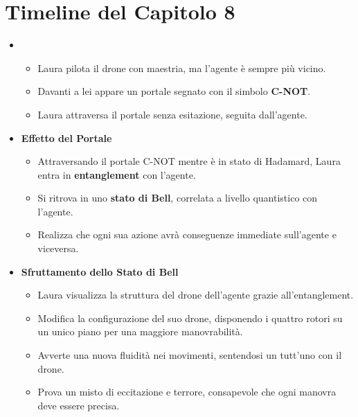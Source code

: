 \section*{Timeline del Capitolo 8}
\begin{itemize}
  \item
    \begin{itemize}
        \item Laura pilota il drone con maestria, ma l'agente è sempre più vicino.
        \item Davanti a lei appare un portale segnato con il simbolo \textbf{C-NOT}.
        \item Laura attraversa il portale senza esitazione, seguita dall'agente.
    \end{itemize}
    \item \textbf{Effetto del Portale}
    \begin{itemize}
        \item Attraversando il portale C-NOT mentre è in stato di Hadamard, Laura entra in \textbf{entanglement} con l'agente.
        \item Si ritrova in uno \textbf{stato di Bell}, correlata a livello quantistico con l'agente.
        \item Realizza che ogni sua azione avrà conseguenze immediate sull'agente e viceversa.
    \end{itemize}
\end{itemize}



\begin{itemize}
    \item \textbf{Sfruttamento dello Stato di Bell}
    \begin{itemize}
        \item Laura visualizza la struttura del drone dell'agente grazie all'entanglement.
        \item Modifica la configurazione del suo drone, disponendo i quattro rotori su un unico piano per una maggiore manovrabilità.
        \item Avverte una nuova fluidità nei movimenti, sentendosi un tutt'uno con il drone.
        \item Prova un misto di eccitazione e terrore, consapevole che ogni manovra deve essere precisa.
    \end{itemize}
\end{itemize}

